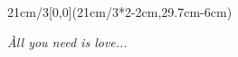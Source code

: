 \begin{textblock*}{21cm/3}[0,0](21cm/3*2-2cm,29.7cm-6cm)
  \begin{flushright}
    {\emph{
      \`All you need is love...}
    }
  \end{flushright}
\end{textblock*}

\null\newpage

